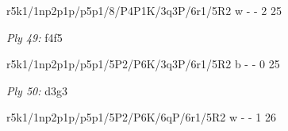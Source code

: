 \documentclass{article}
\begin{document}
r5k1/1np2p1p/p5p1/8/P4P1K/3q3P/6r1/5R2 w - - 2 25


\showboard

\bigskip

\emph{Ply 49:} f4f5


r5k1/1np2p1p/p5p1/5P2/P6K/3q3P/6r1/5R2 b - - 0 25


\showboard

\bigskip

\emph{Ply 50:} d3g3

r5k1/1np2p1p/p5p1/5P2/P6K/6qP/6r1/5R2 w - - 1 26


\showboard

\bigskip
\end{document}

